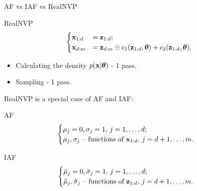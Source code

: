 \documentclass{beamer}
\begin{document}
\begin{frame}{AF vs IAF vs RealNVP}
	\begin{block}{RealNVP}
		\vspace{-0.3cm}
		\[
		\begin{cases}
			\mathbf{x}_{1:d} &= \mathbf{z}_{1:d}; \\ 
			\mathbf{x}_{d:m} &= \mathbf{z}_{d:m} \odot c_1(\mathbf{z}_{1:d}, \boldsymbol{\theta}) + c_2(\mathbf{z}_{1:d}, \boldsymbol{\theta}).
		\end{cases}
		\]
		\vspace{-0.3cm}
	\end{block}
	\begin{itemize}
		\item Calculating the density $p(\mathbf{x} | \boldsymbol{\theta})$ - 1 pass.
		\item Sampling - 1 pass.
	\end{itemize}
	
	RealNVP is a special case of AF and IAF:
	\begin{block}{AF}
		\vspace{-0.5cm}
		\begin{equation*}
			\begin{cases}
				\mu_j  = 0, \sigma_j = 1, \, j = 1, \dots, d; \\
				\mu_j, \sigma_j \text{ -- functions of } \mathbf{x}_{1:d}, \, j = d+1, \dots, m.
			\end{cases}
		\end{equation*}
		\vspace{-0.3cm}
	\end{block}
	\begin{block}{IAF}
		\vspace{-0.3cm}
		\begin{equation*}
			\begin{cases}
				\tilde{\mu}_j = 0, \tilde{\sigma}_j = 1, \, j = 1, \dots, d; \\
				\tilde{\mu}_j, \tilde{\sigma}_j \text{ -- functions of } \mathbf{z}_{1:d}, \, j = d+1, \dots, m.
			\end{cases}
		\end{equation*}
	\end{block}
\end{frame}
\end{document}
